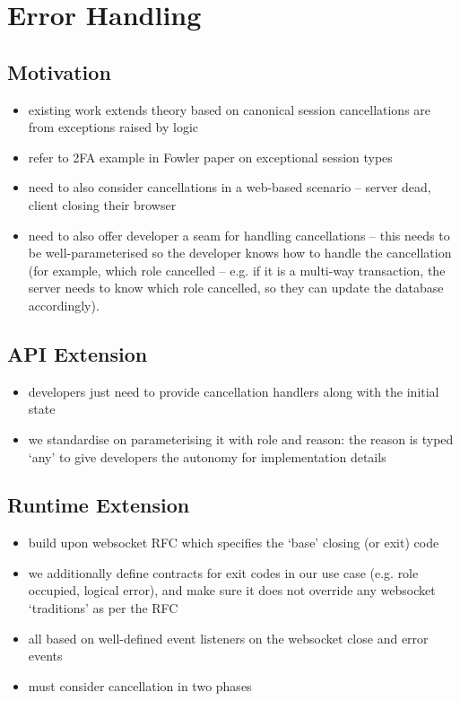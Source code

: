 \section{Error Handling}

\subsection{Motivation}
\begin{itemize}
\item existing work extends theory based on canonical session cancellations are from exceptions raised by logic
\item refer to 2FA example in Fowler paper on exceptional session types
\item need to also consider cancellations in a web-based scenario -- server dead, client closing their browser
\item need to also offer developer a seam for handling cancellations -- this needs to be well-parameterised so the developer knows how to handle the cancellation (for example, which role cancelled -- e.g. if it is a multi-way transaction, the server needs to know which role cancelled, so they can update the database accordingly).
\end{itemize}

\subsection{API Extension}
\begin{itemize}
\item developers just need to provide cancellation handlers along with the initial state
\item we standardise on parameterising it with role and reason: the reason is typed `any' to give developers the autonomy for implementation details
\end{itemize}

\subsection{Runtime Extension}
\begin{itemize}
\item build upon websocket RFC which specifies the `base' closing (or exit) code
\item we additionally define contracts for exit codes in our use case (e.g. role occupied, logical error), and make sure it does not override any websocket `traditions' as per the RFC
\item all based on well-defined event listeners on the websocket close and error events
\item must consider cancellation in two phases
\end{itemize}

